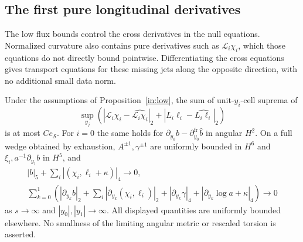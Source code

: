 \subsection{The first pure longitudinal derivatives}

The low flux bounds control the cross derivatives in the null
equations. Normalized curvature also contains pure derivatives such
as $\mathscr L_i\chi_i$, which those equations do not directly bound
pointwise. Differentiating the cross equations gives transport
equations for these missing jets along the opposite direction, with
no additional small data norm.

\begin{proposition}\label{in:pure-jets}
Under the assumptions of Proposition~\ref{in:low}, the sum of
unit-$y_i$-cell suprema of
\begin{equation}\label{in:pure-budget}
 \sup_{y_j}\left(
 |\mathscr L_i\chi_i-\widehat{\mathscr L_i\chi_i}|_2
 +|L_i\ell_i-\widehat{L_i\ell_i}|_2\right)
\end{equation}
is at most $Ce_{\mathcal S}$. For $i=0$ the same holds for
$\partial_{y_0}b-\partial_{y_0}^{\mathrm{fr}}\widehat b$
in angular $H^2$. On a full wedge obtained by exhaustion,
$A^{\pm1},\gamma^{\pm1}$ are uniformly bounded in $H^6$ and
$\xi_i,a^{-1}\partial_{y_1}b$ in $H^5$, and
\begin{equation}\label{in:flank}
\begin{gathered}
 |b|_5+\sum_i|(\chi_i,\ell_i+\kappa)|_4\longrightarrow0,\\
 \sum_{k=0}^1\left(
 |\partial_{y_k}b|_2+
 \sum_i|\partial_{y_k}(\chi_i,\ell_i)|_2
 +|\partial_{y_k}\gamma|_4
 +|\partial_{y_k}\log a+\kappa|_4\right)\longrightarrow0
\end{gathered}
\end{equation}
as $s\to\infty$ and $|y_0|,|y_1|\to\infty$.
All displayed quantities are uniformly bounded elsewhere.
No smallness of the limiting angular metric or rescaled torsion is
asserted.
\end{proposition}

